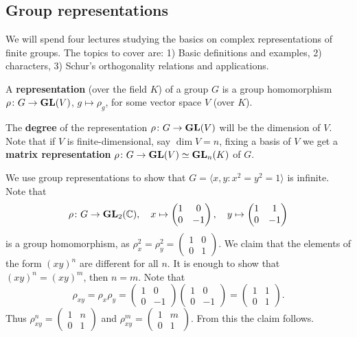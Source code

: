 \chapter{}

\section{Group representations}

We will spend 
four lectures studying the basics on complex representations of finite groups. 
The topics to cover are: 1) Basic definitions and examples, 2) characters, 3)
Schur's orthogonality relations and applications. 

\begin{definition}
	A \textbf{representation} (over the field $K$) of a group $G$ is a group homomorphism
	$\rho\colon G\to\mathbf{GL}(V)$, $g\mapsto\rho_g$, for some vector space $V$ (over $K$).
\end{definition}

The \textbf{degree} of the representation $\rho\colon G\to\mathbf{GL}(V)$ will be the dimension of $V$. Note that
if $V$ is finite-dimensional, say $\dim V=n$, fixing a basis of $V$ we get a \textbf{matrix representation} 
$\rho\colon G\to\mathbf{GL}(V)\simeq\mathbf{GL}_n(K)$ of $G$.  

\begin{example}
	We use group representations to show that 
	$G=\langle x,y:x^2=y^2=1\rangle$ is infinite. Note that
	\[
	\rho\colon G\to\mathbf{GL}_2(\mathbb{C}),
	\quad
	x\mapsto\begin{pmatrix}
		1&0\\
		0&-1	
	\end{pmatrix},\quad
 	y\mapsto\begin{pmatrix}
		1&1\\
		0&-1	
	\end{pmatrix}
 	\]
 	is a group homomorphism, as 
 	$\rho_x^2=\rho_y^2=\begin{pmatrix}
		1&0\\
		0&1	
	\end{pmatrix}$. We claim that the elements of the form $(xy)^n$ are
	different for all $n$. It is enough to show that   
	$(xy)^n=(xy)^m$, then $n=m$. Note that
	\[
	\rho_{xy}=\rho_x\rho_y=\begin{pmatrix}
		1&0\\
		0&-1	
	\end{pmatrix}
	\begin{pmatrix}
		1&0\\
		0&-1	
	\end{pmatrix}
	=\begin{pmatrix}
		1&1\\
		0&1	
	\end{pmatrix}.
	\]
	Thus $\rho_{xy}^n=\begin{pmatrix}
		1&n\\
		0&1	
	\end{pmatrix}$ and 
	$\rho_{xy}^m=\begin{pmatrix}
		1&m\\
		0&1	
	\end{pmatrix}$. From this the claim follows.
\end{example}

